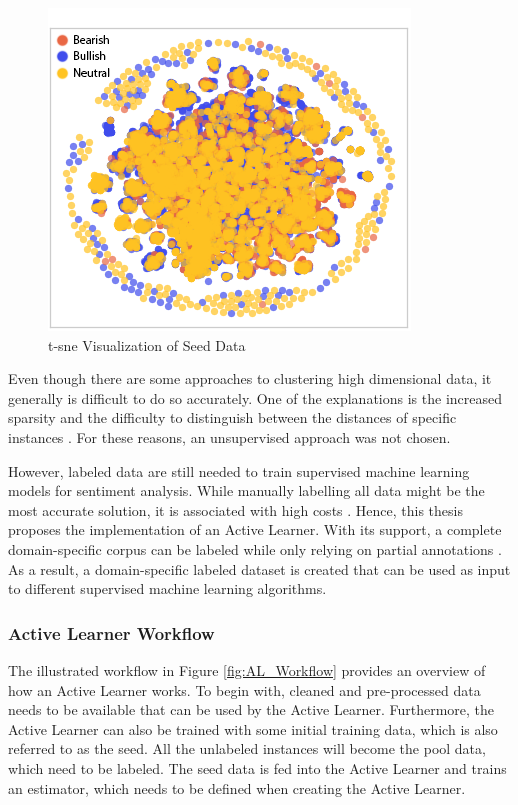 \documentclass[11pt, a4paper]{article}
\begin{document}
\begin{figure}
    \centering
    \includegraphics[width=\textwidth]{tsne_projection.png}
    \caption{t-sne Visualization of Seed Data}
    \label{fig:t-sne}
\end{figure}
\pagebreak
Even though there are some approaches to clustering high dimensional data, it generally is difficult to do so accurately. 
One of the explanations is the increased sparsity and the difficulty to distinguish between the distances 
of specific instances \citep{tomasev2014roleofhubness}. For these reasons, an unsupervised approach was not chosen.

However, labeled data are still needed to train supervised machine learning models for sentiment analysis. While manually labelling
all data might be the most accurate solution, it is associated with high costs \citep{miller2020activelearningapproaches}.
Hence, this thesis proposes the implementation of an Active Learner. With its support, a complete domain-specific corpus can be labeled while only relying on partial annotations \citep{park2015EfficientExtraction}.
As a result, a domain-specific labeled dataset is created that can be used as input to different supervised machine learning algorithms.

\subsubsection{Active Learner Workflow}
The illustrated workflow in Figure \ref{fig:AL_Workflow} provides an overview of how an Active Learner works. 
To begin with, cleaned and pre-processed data needs to be available that can be used by the Active Learner. 
Furthermore, the Active Learner can also be trained with some initial training data, which is also referred to as the seed. 
All the unlabeled instances will become the pool data, which need to be labeled. The seed data is fed into the Active Learner and trains an estimator, 
which needs to be defined when creating the Active Learner.
\end{document}
